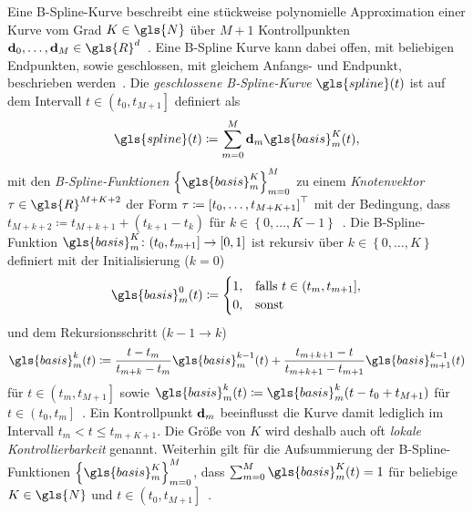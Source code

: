 Eine B-Spline-Kurve beschreibt eine stückweise polynomielle Approximation einer Kurve vom Grad $K \in \gls{N}$ über $M + 1$ Kontrollpunkten $\ve{d}_0, \ldots, \ve{d}_M \in \gls{R}^d$~\cite{deBoor}.
Eine B-Spline Kurve kann dabei offen, \dhe{} mit beliebigen Endpunkten, sowie geschlossen, \dhe{} mit gleichem Anfangs- und Endpunkt, beschrieben werden~\cite{gm}.
Die \emph{geschlossene B-Spline-Kurve} $\gls{spline}\left(t\right)$ ist auf dem Intervall $t \in \left(t_0, t_{M+1}\right]$ definiert als
\begin{equation}
  \gls{spline}\left(t\right) \coloneqq \sum_{m = 0}^M \ve{d}_m \gls{basis}_m^K\left(t\right),
    \label{eq:bspline}
\end{equation}
mit den \emph{B-Spline-Funktionen} ${\left\{\gls{basis}_m^K\right\}}_{m=0}^M$ zu einem \emph{Knotenvektor} $\ve{\tau} \in \gls{R}^{M+K+2}$ der Form $\ve{\tau} \coloneqq {\left[t_0, \ldots, t_{M+K+1}\right]}^{\top}$ mit der Bedingung, dass $t_{M+k+2} \coloneqq t_{M+k+1} + \left(t_{k+1} - t_k\right)$ für $k \in \left\{0, \ldots, K-1\right\}$~\cite{gm}.
Die B-Spline-Funktion $\gls{basis}_m^K \colon \left(t_0, t_{m+1}\right] \to \left[0, 1\right]$ ist rekursiv über $k \in \left\{0, \ldots, K \right\}$ definiert mit der Initialisierung ($k=0$)
\begin{equation*}
  \gls{basis}_m^0\left(t\right) \coloneqq \begin{cases}
    1, & \text{falls }t \in \left(t_m, t_{m+1}\right],\\
    0, & \text{sonst}
  \end{cases}
\end{equation*}
und dem Rekursionsschritt ($k - 1 \rightarrow k$)
\begin{equation*}
  \gls{basis}_m^k\left(t\right) \coloneqq \frac{t-t_m}{t_{m+k} - t_m}\gls{basis}^{k-1}_m\left(t\right) + \frac{t_{m+k+1} - t}{t_{m+k+1} - t_{m+1}} \gls{basis}_{m+1}^{k-1}\left(t\right)
\end{equation*}
für $t \in \left(t_m, t_{M+1}\right]$ sowie $\gls{basis}_m^k\left(t\right) \coloneqq \gls{basis}_m^k\left(t - t_0 + t_{M+1}\right)$ für $t \in \left(t_0, t_m\right]$~\cite{gm}.
Ein Kontrollpunkt $\mathbf{d}_m$ beeinflusst die Kurve damit lediglich im Intervall $t_m < t \leq t_{m+K+1}$.
Die Größe von $K$ wird deshalb auch oft \emph{lokale Kontrollierbarkeit} genannt.
Weiterhin gilt für die Aufsummierung der B-Spline-Funktionen ${\left\{\gls{basis}_m^K\right\}}_{m=0}^M$, dass $\sum_{m=0}^M \gls{basis}_m^K\left(t\right) = 1$ für beliebige $K \in \gls{N}$ und $t \in \left(t_0, t_{M+1}\right]$~\cite{deBoor}.

